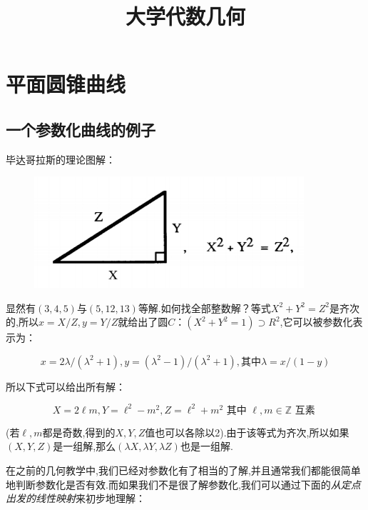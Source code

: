 \documentclass[UTF8]{book}
\begin{document}
\title{\centering\textbf{大学代数几何}}
\maketitle
\chapter{平面圆锥曲线}
	\section{一个参数化曲线的例子}
		毕达哥拉斯的理论图解：
	
		\begin{figure}[H]
			 \centering
			 \includegraphics[width=10cm]{9.jpg}\\
		\end{figure}
	
		显然有$  (3,4,5)  $与$ (5,12,13) $等解.如何找全部整数解？等式$X^{2}+Y^{2}=Z^{2}$是齐次的,所以$ x=X/Z,y=Y/Z $就给出了圆$ C：(X^{2}+Y^{2}=1) \supset R^{2}$,它可以被参数化表示为：
		
		\begin{equation*}
			x=2 \lambda /\left(\lambda^{2}+1\right), y=\left(\lambda^{2}-1\right) /\left(\lambda^{2}+1\right),其中\lambda=x /(1-y)
		\end{equation*}
		
		
		所以下式可以给出所有解：
		
		
		\begin{equation*}
			X=2 \ell m, Y=\ell^{2}-m^{2}, Z=\ell^{2}+m^{2}\text { 其中 }\ell, m \in \mathbb{Z} \text { 互素 }
		\end{equation*}
	
	
		(若$ \ell,m $都是奇数,得到的$ X,Y,Z $值也可以各除以2).由于该等式为齐次,所以如果$ (X,Y,Z) $是一组解,那么$ (\lambda X,\lambda Y,\lambda Z) $也是一组解.
		
		
		在之前的几何教学中,我们已经对参数化有了相当的了解,并且通常我们都能很简单地判断参数化是否有效.而如果我们不是很了解参数化,我们可以通过下面的\textit{从定点出发的线性映射}来初步地理解：
	
\end{document}
